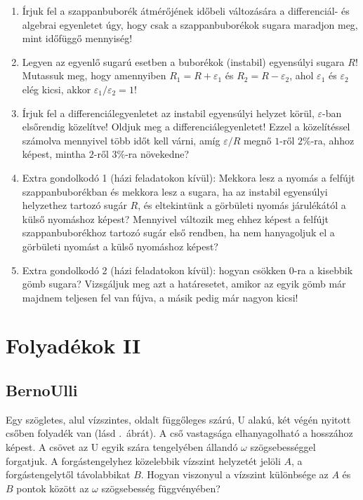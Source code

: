 \documentclass[12pt,a4paper]{scrartcl}
\begin{document}
\begin{enumerate}
\item Írjuk fel a szappanbuborék átmérőjének időbeli változására a differenciál- és algebrai egyenletet úgy, hogy csak a szappanbuborékok sugara maradjon meg, mint időfüggő mennyiség!
\item Legyen az egyenlő sugarú esetben a buborékok (instabil) egyensúlyi sugara $R$! Mutassuk meg, hogy amennyiben $R_1 = R + \varepsilon_1$ és $R_2 = R - \varepsilon_2$, ahol $\varepsilon_1$ és $\varepsilon_2$ elég kicsi, akkor $\varepsilon_1/\varepsilon_2=1$!
\item Írjuk fel a differenciálegyenletet az instabil egyensúlyi helyzet körül, $\varepsilon$-ban elsőrendig közelítve! Oldjuk meg a differenciálegyenletet! Ezzel a közelítéssel számolva mennyivel több időt kell várni, amíg $\varepsilon/R$ megnő $1$-ről $2\%$-ra, ahhoz képest, mintha $2$-ről $3\%$-ra növekedne?
\item Extra gondolkodó 1 (házi feladatokon kívül): Mekkora lesz a nyomás a felfújt szappanbuborékban és mekkora lesz a sugara, ha az instabil egyensúlyi helyzethez tartozó sugár $R$, és eltekintünk a görbületi nyomás járulékától a külső nyomáshoz képest? Mennyivel változik meg ehhez képest a felfújt szappanbuborékhoz tartozó sugár első rendben, ha nem hanyagoljuk el a görbületi nyomást a külső nyomáshoz képest?
\item Extra gondolkodó 2 (házi feladatokon kívül): hogyan csökken 0-ra a kisebbik gömb sugara? Vizsgáljuk meg azt a határesetet, amikor az egyik gömb már majdnem teljesen fel van fújva, a másik pedig már nagyon kicsi!
\end{enumerate}

\section{Folyadékok II}
\subsection{BernoUlli}
Egy szögletes, alul vízszintes, oldalt függőleges szárú, U alakú, két végén nyitott csőben folyadék van (lásd .\ ábrát). A cső vastagsága elhanyagolható a hosszához képest. A csövet az U egyik szára tengelyében állandó $\omega$ szögsebességgel forgatjuk. A forgástengelyhez közelebbik vízszint helyzetét jelöli $A$, a forgástengelytől távolabbikat $B$. Hogyan viszonyul a vízszint különbsége az $A$ és $B$ pontok között az $\omega$ szögsebesség függvényében?
\end{document}
